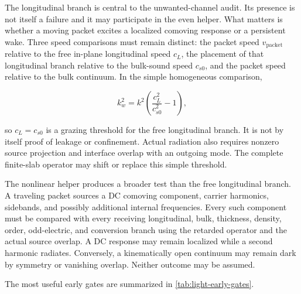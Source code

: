 The longitudinal branch is central to the unwanted-channel audit. Its presence
is not itself a failure and it may participate in the even helper. What matters
is whether a moving packet excites a localized comoving response or a persistent
wake. Three speed comparisons must remain distinct: the packet speed
\(v_{\mathrm{packet}}\) relative to the free in-plane longitudinal speed
\(c_L\), the placement of that longitudinal branch relative to the bulk-sound
speed \(c_{s0}\), and the packet speed relative to the bulk continuum. In the
simple homogeneous comparison,

\[
k_w^2
=
k^2\left(\frac{c_L^2}{c_{s0}^2}-1\right),
\]

so \(c_L=c_{s0}\) is a grazing threshold for the free longitudinal branch. It
is not by itself proof of leakage or confinement. Actual radiation also
requires nonzero source projection and interface overlap with an outgoing mode.
The complete finite-slab operator may shift or replace this simple threshold.

The nonlinear helper produces a broader test than the free longitudinal
branch. A traveling packet sources a DC comoving component, carrier harmonics,
sidebands, and possibly additional internal frequencies. Every such component
must be compared with every receiving longitudinal, bulk, thickness, density,
order, odd-electric, and conversion branch using the retarded operator and the
actual source overlap. A DC response may remain localized while a second
harmonic radiates. Conversely, a kinematically open continuum may remain dark
by symmetry or vanishing overlap. Neither outcome may be assumed.

The most useful early gates are summarized in
\cref{tab:light-early-gates}.

